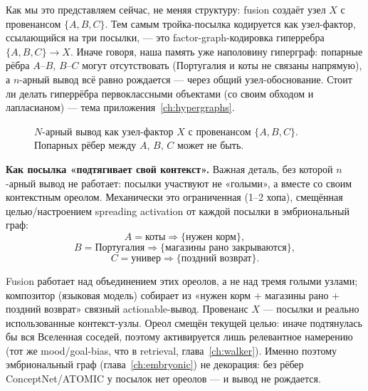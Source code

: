 Как мы это представляем сейчас, не меняя структуру: fusion создаёт узел $X$ с
провенансом $\{A,B,C\}$. Тем самым тройка-посылка кодируется как
узел-фактор, ссылающийся на три посылки, --- это factor-graph-кодировка
гиперребра $\{A,B,C\} \to X$. Иначе говоря, наша память уже наполовину
гиперграф: попарные рёбра $A$--$B$, $B$--$C$ могут отсутствовать (Португалия и
коты не связаны напрямую), а $n$-арный вывод всё равно рождается --- через
общий узел-обоснование. Стоит ли делать гиперрёбра первоклассными объектами
(со своим обходом и лапласианом) --- тема приложения~\ref{ch:hypergraphs}.

\begin{figure}[h]
\centering
{}
\caption{$N$-арный вывод как узел-фактор $X$ с провенансом $\{A,B,C\}$.
Попарных рёбер между $A$, $B$, $C$ может не быть.}
\end{figure}

\smallskip\noindent\textbf{Как посылка «подтягивает свой контекст».}
Важная деталь, без которой $n$-арный вывод не работает: посылки участвуют не
«голыми», а вместе со своим контекстным ореолом. Механически это ограниченная
(1--2 хопа), смещённая целью/настроением spreading activation от каждой посылки
в эмбриональный граф:
\[
A = \text{коты} \Rightarrow \{\text{нужен корм}\},
\]
\[
B = \text{Португалия} \Rightarrow \{\text{магазины рано закрываются}\},
\]
\[
C = \text{универ} \Rightarrow \{\text{поздний возврат}\}.
\]

Fusion работает над объединением этих ореолов, а не над тремя голыми узлами;
композитор (языковая модель) собирает из «нужен корм + магазины рано + поздний
возврат» связный actionable-вывод. Провенанс $X$ --- посылки и реально
использованные контекст-узлы. Ореол смещён текущей целью: иначе подтянулась бы
вся Вселенная соседей, поэтому активируется лишь релевантное намерению (тот же
mood/goal-bias, что в retrieval, глава~\ref{ch:walker}). Именно поэтому
эмбриональный граф (глава~\ref{ch:embryonic}) не декорация: без рёбер
ConceptNet/ATOMIC у посылок нет ореолов --- и вывод не рождается.

